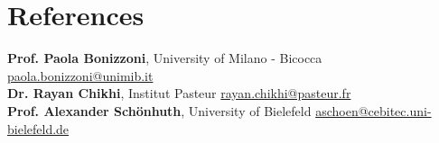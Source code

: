 \documentclass[letterpaper,11pt]{article}
\begin{document}
\section{References}
 \begin{itemize}[leftmargin=0.15in, label={}]
    \small{\item{
     \textbf{Prof. Paola Bonizzoni}{, University of Milano - Bicocca \hfill \href{mailto:paola.bonizzoni@unimib.it}{paola.bonizzoni@unimib.it}}\\
     \textbf{Dr. Rayan Chikhi}{, Institut Pasteur \hfill \href{mailto:rayan.chikhi@pasteur.fr}{rayan.chikhi@pasteur.fr}}\\
     \textbf{Prof. Alexander Sch\"{o}nhuth}{, University of Bielefeld \hfill \href{mailto:aschoen@cebitec.uni-bielefeld.de}{aschoen@cebitec.uni-bielefeld.de}}
    }}
 \end{itemize}
 
\end{document}
